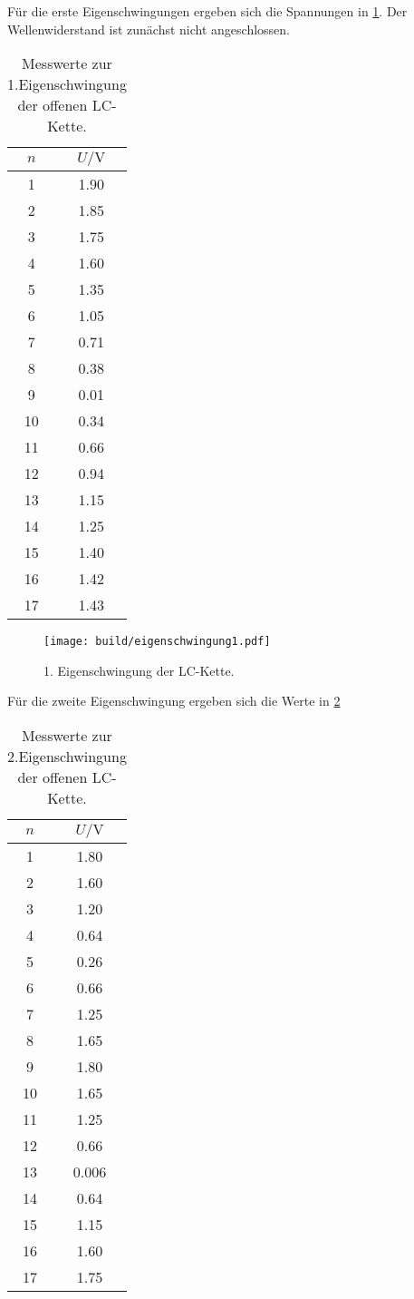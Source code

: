 Für die erste Eigenschwingungen ergeben sich die Spannungen in \ref{tab:eigenschwingung1}. Der Wellenwiderstand ist zunächst nicht angeschlossen.
\begin{table}
  \centering
  \caption{Messwerte zur 1.Eigenschwingung der offenen LC-Kette.}
  \label{tab:eigenschwingung1}
  \begin{tabular}{c c}
    \toprule
    $n$ & $U / \si{\volt}$ \\
\midrule
1 & 1.90 \\
2 & 1.85 \\
3 & 1.75 \\
4 & 1.60 \\
5 & 1.35 \\
6 & 1.05 \\
7 & 0.71 \\
8 & 0.38 \\
9 & 0.01 \\
10 & 0.34 \\
11 & 0.66 \\
12 & 0.94 \\
13 & 1.15 \\
14 & 1.25 \\
15 & 1.40 \\
16 & 1.42 \\
17 & 1.43 \\
\bottomrule
\end{tabular}
\end{table}

\begin{figure}
  \centering
  \texttt{[image: build/eigenschwingung1.pdf]}
\caption{1. Eigenschwingung der LC-Kette.}
  \label{fig:eigenschwingung1}
\end{figure}

Für die zweite Eigenschwingung ergeben sich die Werte in \ref{tab:eigenschwingung2}

\begin{table}
  \centering
  \caption{Messwerte zur 2.Eigenschwingung der offenen LC-Kette.}
  \label{tab:eigenschwingung2}
  \begin{tabular}{c c}
    \toprule
    $n$ & $U / \si{\volt}$ \\
\midrule
1 & 1.80 \\
2 & 1.60 \\
3 & 1.20 \\
4 & 0.64 \\
5 & 0.26 \\
6 & 0.66 \\
7 & 1.25 \\
8 & 1.65 \\
9 & 1.80 \\
10 & 1.65 \\
11 & 1.25 \\
12 & 0.66 \\
13 & 0.006 \\
14 & 0.64 \\
15 & 1.15 \\
16 & 1.60 \\
17 & 1.75 \\
\bottomrule
\end{tabular}
\end{table}

